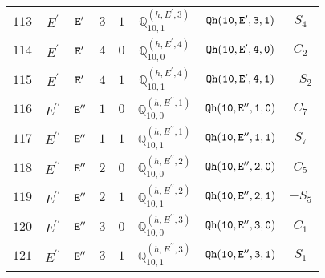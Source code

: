 \documentclass[fleqn,8pt]{jsarticle}
\begin{document}
\begin{table}[ht!]
\begin{center}
\begin{tabular}{cccccccc}
$ 113 $ & $ E^{\prime} $ & $ {\tt E'} $ & $ 3 $ & $ 1 $ & $ \mathbb{Q}_{10,1}^{(h,E^{\prime},3)} $ & $ {\tt Qh(10,E',3,1)} $ & $ S_{4} $ \\
$ 114 $ & $ E^{\prime} $ & $ {\tt E'} $ & $ 4 $ & $ 0 $ & $ \mathbb{Q}_{10,0}^{(h,E^{\prime},4)} $ & $ {\tt Qh(10,E',4,0)} $ & $ C_{2} $ \\
$ 115 $ & $ E^{\prime} $ & $ {\tt E'} $ & $ 4 $ & $ 1 $ & $ \mathbb{Q}_{10,1}^{(h,E^{\prime},4)} $ & $ {\tt Qh(10,E',4,1)} $ & $ - S_{2} $ \\
$ 116 $ & $ E^{\prime\prime} $ & $ {\tt E''} $ & $ 1 $ & $ 0 $ & $ \mathbb{Q}_{10,0}^{(h,E^{\prime\prime},1)} $ & $ {\tt Qh(10,E'',1,0)} $ & $ C_{7} $ \\
$ 117 $ & $ E^{\prime\prime} $ & $ {\tt E''} $ & $ 1 $ & $ 1 $ & $ \mathbb{Q}_{10,1}^{(h,E^{\prime\prime},1)} $ & $ {\tt Qh(10,E'',1,1)} $ & $ S_{7} $ \\
$ 118 $ & $ E^{\prime\prime} $ & $ {\tt E''} $ & $ 2 $ & $ 0 $ & $ \mathbb{Q}_{10,0}^{(h,E^{\prime\prime},2)} $ & $ {\tt Qh(10,E'',2,0)} $ & $ C_{5} $ \\
$ 119 $ & $ E^{\prime\prime} $ & $ {\tt E''} $ & $ 2 $ & $ 1 $ & $ \mathbb{Q}_{10,1}^{(h,E^{\prime\prime},2)} $ & $ {\tt Qh(10,E'',2,1)} $ & $ - S_{5} $ \\
$ 120 $ & $ E^{\prime\prime} $ & $ {\tt E''} $ & $ 3 $ & $ 0 $ & $ \mathbb{Q}_{10,0}^{(h,E^{\prime\prime},3)} $ & $ {\tt Qh(10,E'',3,0)} $ & $ C_{1} $ \\
$ 121 $ & $ E^{\prime\prime} $ & $ {\tt E''} $ & $ 3 $ & $ 1 $ & $ \mathbb{Q}_{10,1}^{(h,E^{\prime\prime},3)} $ & $ {\tt Qh(10,E'',3,1)} $ & $ S_{1} $ \\
 \hline \hline
\end{tabular}
\end{center}
\end{table}
\end{document}

